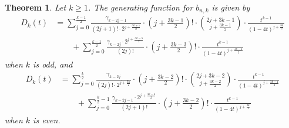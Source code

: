 \documentclass[reqno, 12pt]{article}
\newtheorem{thm}{Theorem}[section]
\theoremstyle{mydefinition}
\theoremstyle{myremark}
\numberwithin{algorithm}{section}
\begin{document}
\begin{thm}\label{Generating-function-odd-line-bnk}
Let $k\geq 1$. The generating function for $b_{n,k}$ is given by
\begin{align*}
D_k(t)&=\sum_{j=0}^{\frac{k-1}{2}} \frac{\gamma_{k-2j-1}}{(2j+1)! \cdot 2^{j+\frac{3k+1}{2}}}\cdot \left(j+\frac{3k-1}{2}\right)! \cdot \binom{2j+3k-1}{j+\frac{3k-1}{2}}\cdot \frac{t^{k-1}}{(1-4t)^{j+\frac{3k}{2}}}
\\ & \quad\quad +\sum_{j=0}^{\frac{k-1}{2}}\frac{\gamma_{k-2j}\cdot  2^{j+\frac{3k-5}{2}}}{(2j)!}\cdot\left(j+\frac{3k-3}{2}\right)!\cdot \frac{t^{k-1}}{(1-4t)^{j+\frac{3k-1}{2}}}
\end{align*}
when $k$ is odd, and
\begin{align*}
D_k(t)&=\sum_{j=0}^{\frac{k}{2}} \frac{\gamma_{k-2j}}{(2j)! \cdot 2^{j+\frac{3k}{2}}}\cdot \left(j+\frac{3k-2}{2}\right)! \cdot \binom{2j+3k-2}{j+\frac{3k-2}{2}}\cdot \frac{t^{k-1}}{(1-4t)^{j+\frac{3k-1}{2}}}
\\ & \quad\quad +\sum_{j=0}^{\frac{k}{2}-1}\frac{\gamma_{k-2j-1}\cdot  2^{j+\frac{3k-4}{2}}}{(2j+1)!}\cdot\left(j+\frac{3k-2}{2}\right)!\cdot \frac{t^{k-1}}{(1-4t)^{j+\frac{3k}{2}}}
\end{align*}
when $k$ is even.
\end{thm}
\end{document}
